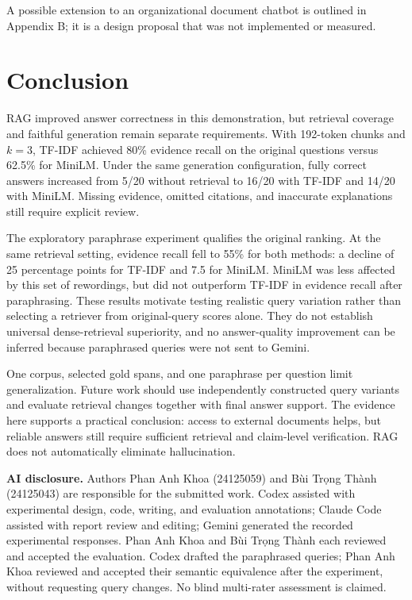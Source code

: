 \documentclass[12pt,a4paper]{article}
\begin{document}
A possible extension to an organizational document chatbot is outlined in Appendix B; it is a design proposal that was not implemented or measured.

\section{Conclusion}
RAG improved answer correctness in this demonstration, but retrieval coverage and faithful generation remain separate requirements. With 192-token chunks and $k=3$, TF-IDF achieved 80\% evidence recall on the original questions versus 62.5\% for MiniLM. Under the same generation configuration, fully correct answers increased from 5/20 without retrieval to 16/20 with TF-IDF and 14/20 with MiniLM. Missing evidence, omitted citations, and inaccurate explanations still require explicit review.

The exploratory paraphrase experiment qualifies the original ranking. At the same retrieval setting, evidence recall fell to 55\% for both methods: a decline of 25 percentage points for TF-IDF and 7.5 for MiniLM. MiniLM was less affected by this set of rewordings, but did not outperform TF-IDF in evidence recall after paraphrasing. These results motivate testing realistic query variation rather than selecting a retriever from original-query scores alone. They do not establish universal dense-retrieval superiority, and no answer-quality improvement can be inferred because paraphrased queries were not sent to Gemini.

One corpus, selected gold spans, and one paraphrase per question limit generalization. Future work should use independently constructed query variants and evaluate retrieval changes together with final answer support. The evidence here supports a practical conclusion: access to external documents helps, but reliable answers still require sufficient retrieval and claim-level verification. RAG does not automatically eliminate hallucination.

\textbf{AI disclosure.} Authors Phan Anh Khoa (24125059) and Bùi Trọng Thành (24125043) are responsible for the submitted work. Codex assisted with experimental design, code, writing, and evaluation annotations; Claude Code assisted with report review and editing; Gemini generated the recorded experimental responses. Phan Anh Khoa and Bùi Trọng Thành each reviewed and accepted the evaluation. Codex drafted the paraphrased queries; Phan Anh Khoa reviewed and accepted their semantic equivalence after the experiment, without requesting query changes. No blind multi-rater assessment is claimed.
\end{document}
